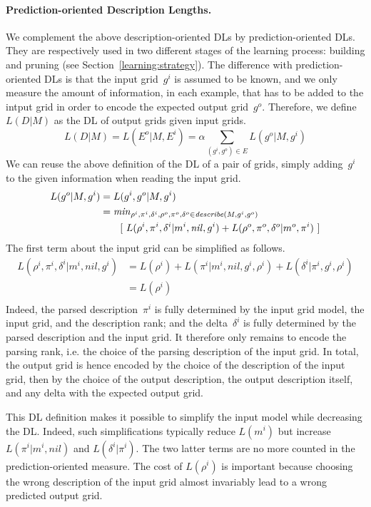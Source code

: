 \documentclass[a4paper]{llncs}
\begin{document}
\paragraph{Prediction-oriented Description Lengths.}
We complement the above description-oriented DLs by
prediction-oriented DLs. They are respectively used in two different
stages of the learning process: building and pruning (see
Section~\ref{learning:strategy}). The difference with
prediction-oriented DLs is that the input grid~$g^i$ is assumed to be
known, and we only measure the amount of information, in each example,
that has to be added to the intput grid in order to encode the
expected output grid~$g^o$.
%
Therefore, we define $L(D|M)$ as the DL of output grids given input
grids.
\[ L(D|M) = L(E^o|M,E^i) = \alpha \sum_{(g^i,g^o) \in E} L(g^o|M,g^i) \]
%
We can reuse the above definition of the DL of a pair of grids, simply
adding~$g^i$ to the given information when reading the input grid.
\begin{align*}
  L(g^o|M,g^i) & = L(g^i,g^o|M,g^i) \\
               & = {\it min}_{\rho^i, \pi^i, \delta^i, \rho^o, \pi^o, \delta^o \in {\it describe}(M,g^i,g^o)} \\
               & \quad\quad  [\  L(\rho^i,\pi^i,\delta^i|m^i,{\it nil},g^i) + L(\rho^o,\pi^o,\delta^o|m^o,\pi^i) \ ]
\end{align*}
%
The first term about the input grid can be simplified as follows.
\begin{align*}
  L(\rho^i,\pi^i,\delta^i|m^i,nil,g^i) & = L(\rho^i) + L(\pi^i|m^i,nil,g^i,\rho^i) + L(\delta^i|\pi^i,g^i,\rho^i) \\
                                       & = L(\rho^i) \\
\end{align*}
Indeed, the parsed description~$\pi^i$ is fully determined by the
input grid model, the input grid, and the description rank; and the
delta~$\delta^i$ is fully determined by the parsed description and the
input grid. It therefore only remains to encode the parsing rank,
i.e. the choice of the parsing description of the input grid.  In
total, the output grid is hence encoded by the choice of the
description of the input grid, then by the choice of the output
description, the output description itself, and any delta with the
expected output grid.

This DL definition makes it possible to simplify the input model while
decreasing the DL. Indeed, such simplifications typically reduce
$L(m^i)$ but increase $L(\pi^i|m^i,nil)$ and $L(\delta^i|\pi^i)$. The
two latter terms are no more counted in the prediction-oriented
measure. The cost of $L(\rho^i)$ is important because choosing the
wrong description of the input grid almost invariably lead to a wrong
predicted output grid.
\end{document}
